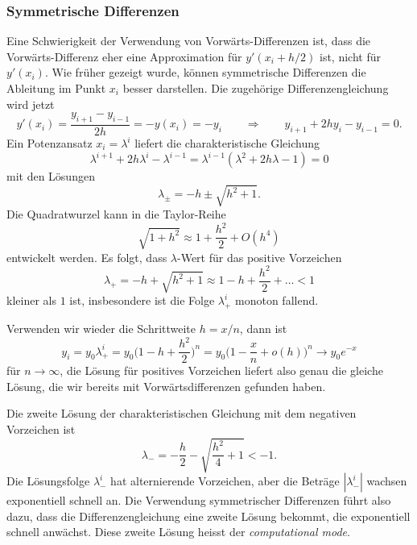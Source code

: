 \subsubsection{Symmetrische Differenzen}
Eine Schwierigkeit der Verwendung von Vorwärts-Differenzen ist, dass
die Vorwärts-Differenz eher eine Approximation für $y'(x_i+h/2)$ ist,
nicht für $y'(x_i)$.
Wie früher gezeigt wurde, können symmetrische Differenzen die Ableitung
im Punkt $x_i$ besser darstellen.
Die zugehörige Differenzengleichung wird jetzt
\[
y'(x_i)
=
\frac{y_{i+1}-y_{i-1}}{2h}
=
-y(x_i)
=
-y_i
\qquad\Rightarrow\qquad
y_{i+1}+2hy_i-y_{i-1}=0.
\]
Ein Potenzansatz $x_i=\lambda^i$ liefert die charakteristische Gleichung
\[
\lambda^{i+1} +2h\lambda^i -\lambda^{i-1}
=
\lambda^{i-1}(\lambda^2 + 2h\lambda -1)
=
0
\]
mit den Lösungen
\[
\lambda_\pm = -h \pm \sqrt{h^2+1}.
\]
Die Quadratwurzel kann in die Taylor-Reihe
%
%
\[
\sqrt{1+h^2}
\approx
1 + \frac{h^2}2 + O(h^4)
\]
entwickelt werden.
Es folgt, dass $\lambda$-Wert für das positive Vorzeichen
\[
\lambda_+
=
-h+\sqrt{h^2+1}
\approx
1-h+\frac{h^2}{2}+\dots
<
1
\]
kleiner als $1$ ist, insbesondere ist die Folge $\lambda_+^i$ monoton fallend.

Verwenden wir wieder die Schrittweite $h=x/n$, dann ist
\[
y_i
=
y_0 \lambda_+^i
=
y_0 \biggl(1-h+\frac{h^2}2\biggr)^n
=
y_0\biggl(1-\frac{x}n + o(h)\biggr)^n
\to
y_0e^{-x}
\]
für $n\to\infty$, die Lösung für positives Vorzeichen liefert also genau
die gleiche Lösung, die wir bereits mit Vorwärtsdifferenzen gefunden haben.

Die zweite Lösung der charakteristischen Gleichung mit dem negativen
Vorzeichen ist
\[
\lambda_-
=
-\frac{h}2 - \sqrt{\frac{h^2}{4}+1}
<
-1.
\]
Die Lösungsfolge $\lambda_-^i$ hat alternierende Vorzeichen, aber die 
Beträge $|\lambda_-^i|$ wachsen exponentiell schnell an.
Die Verwendung symmetrischer Differenzen führt also dazu, dass die
Differenzengleichung eine zweite Lösung bekommt, die exponentiell
schnell anwächst.
Diese zweite Lösung heisst der {\em computational mode}.
%

